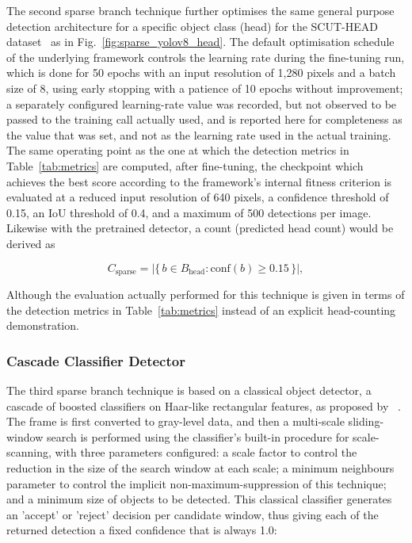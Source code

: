 The second sparse branch technique further optimises the same general purpose detection architecture for a specific object class (head) for the SCUT-HEAD dataset~\cite{peng2018scuthead} as in Fig.~\ref{fig:sparse_yolov8_head}. The default optimisation schedule of the underlying framework controls the learning rate during the fine-tuning run, which is done for 50 epochs with an input resolution of 1{,}280 pixels and a batch size of 8, using early stopping with a patience of 10 epochs without improvement; a separately configured learning-rate value was recorded, but not observed to be passed to the training call actually used, and is reported here for completeness as the value that was set, and not as the learning rate used in the actual training. The same operating point as the one at which the detection metrics in Table~\ref{tab:metrics} are computed, after fine-tuning, the checkpoint which achieves the best score according to the framework's internal fitness criterion is evaluated at a reduced input resolution of 640 pixels, a confidence threshold of 0.15, an IoU threshold of 0.4, and a maximum of 500 detections per image. Likewise with the pretrained detector, a count (predicted head count) would be derived as

\begin{equation}
	C_{\text{sparse}} = \bigl|\{\, b \in B_{\text{head}} : \text{conf}(b) \ge 0.15 \,\}\bigr|,
\end{equation}

Although the evaluation actually performed for this technique is given in terms of the detection metrics in Table~\ref{tab:metrics} instead of an explicit head-counting demonstration.

\subsubsection{Cascade Classifier Detector}

The third sparse branch technique is based on a classical object detector, a cascade of boosted classifiers on Haar-like rectangular features, as proposed by ~\cite{viola2001rapid}. The frame is first converted to gray-level data, and then a multi-scale sliding-window search is performed using the classifier's built-in procedure for scale-scanning, with three parameters configured: a scale factor to control the reduction in the size of the search window at each scale; a minimum neighbours parameter to control the implicit non-maximum-suppression of this technique; and a minimum size of objects to be detected. This classical classifier generates an 'accept' or 'reject' decision per candidate window, thus giving each of the returned detection a fixed confidence that is always 1.0:

